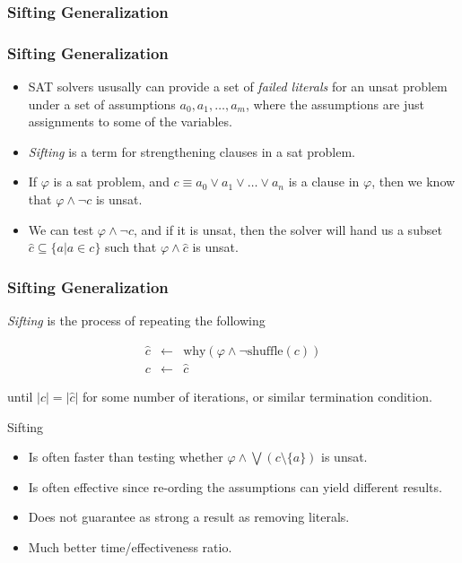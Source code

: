 \documentclass{beamer}
\begin{document}
\subsubsection{Sifting Generalization}
\begin{frame}
	\frametitle{Sifting Generalization}

\begin{itemize}
	\item SAT solvers ususally can provide a set of {\em failed literals} for an 
unsat problem under a set of assumptions $a_0, a_1, \ldots, a_m$, where
the assumptions are just assignments to some of the variables.

\item {\em Sifting} is a term for strengthening clauses in a sat problem.

\item If $\varphi$ is a sat problem, and $c \equiv a_0 \vee a_1 \vee \ldots \vee a_n$
is a clause in $\varphi$, then we know that $\varphi \wedge \neg c$ is unsat.

\item We can test $\varphi \wedge \neg c$, and if it is unsat, then the solver 
	will hand us a subset $\hat{c} \subseteq \{ a | a \in c \}$ such
	that $\varphi \wedge \hat{c}$ is unsat.
\end{itemize}
\end{frame}

\begin{frame}
	\frametitle{Sifting Generalization}
	{\em Sifting} is the process of repeating the following

	\begin{align*}
		\hat{c} & \leftarrow & \mbox{why}(\varphi \wedge \neg \mbox{shuffle}(c))\\
		c & \leftarrow & \hat{c}
	\end{align*}

	until $|c| = |\hat{c}|$ for some number of iterations, or similar termination
	condition.

	Sifting 
	\begin{itemize}
		\item Is often faster than testing whether $\varphi \wedge \bigvee (c \setminus \{a\})$ 
			is unsat.
		\item Is often effective since re-ording the assumptions can yield 
			different results.
		\item Does not guarantee as strong a result as removing literals.
		\item Much better time/effectiveness ratio.
	\end{itemize}

\end{frame}
\end{document}
